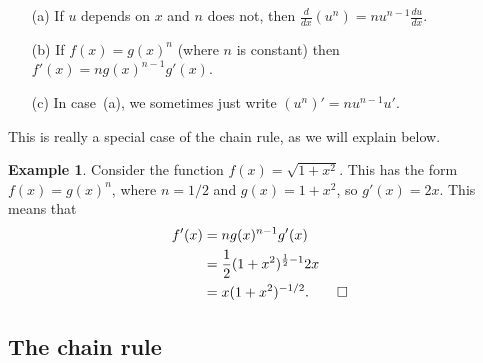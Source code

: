 \documentclass[a4paper]{book}
\theoremstyle{definition}
\newtheorem{example}[theorem]{Example}
\begin{document}
\begin{itemize}
 \item[(a)] If $u$ depends on $x$ and $n$ does not, then
  $\frac{d}{dx}(u^n)=nu^{n-1}\frac{du}{dx}$. 
 \item[(b)] If $f(x)=g(x)^n$ (where $n$ is constant) then
  $f'(x)=ng(x)^{n-1}g'(x)$.
 \item[(c)] In case~(a), we sometimes just write $(u^n)'=nu^{n-1}u'$. 
\end{itemize}
This is really a special case of the chain rule, as we will explain
below. 
\begin{example}
 Consider the function $f(x)=\sqrt{1+x^2}$.  This has the form
 $f(x)=g(x)^n$, where $n=1/2$ and $g(x)=1+x^2$, so $g'(x)=2x$.  This
 means that 
 \begin{align*}
  f'(x) &= n g(x)^{n-1} g'(x) \\
        &= \frac{1}{2} (1+x^2)^{\frac{1}{2}-1} 2x \\
        &= x (1+x^2)^{-1/2}. \qed
 \end{align*}
\end{example}

\subsection{The chain rule}
\label{subsec-rule-chain}
\end{document}
